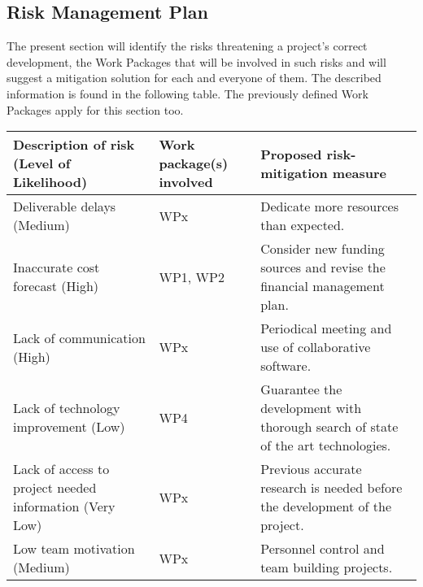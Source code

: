 \subsection{Risk Management Plan}

The present section will identify the risks threatening a project's correct development, the Work Packages that will be involved in such risks and will suggest a mitigation solution for each and everyone of them. The described information is found in the following table. The previously defined Work Packages apply for this section too.

\begin{longtable}[H]{p{4cm} p{4.7cm} p{5cm}}
	\toprule[2pt]
	
	\textbf{Description of risk (Level of Likelihood)} & \textbf{Work package(s) involved} & \textbf{Proposed risk-mitigation measure} \\
	
	\midrule[1.5pt] 
	\endhead
	
	Deliverable delays (Medium) & WPx & Dedicate more resources than expected. \vspace{0.2cm} \\
	
	\midrule

	Inaccurate cost forecast (High) & WP1, WP2 & Consider new funding sources and revise the financial management plan. \vspace{0.2cm} \\
	
	\midrule
	
	Lack of communication (High) & WPx & Periodical meeting and use of collaborative software.  \vspace{0.2cm} \\

	\midrule

 	Lack of technology improvement (Low) & WP4 & Guarantee the development with thorough search of state of the art technologies.  \vspace{0.2cm} \\
 	
 	\midrule
 	
 	Lack of access to project needed information (Very Low) & WPx & Previous accurate research is needed before the development of the project. \vspace{0.2cm} \\
 
 	\midrule

	Low team motivation (Medium) & WPx & Personnel control and team building projects. \vspace{0.2cm} \\
 	

\end{longtable}
